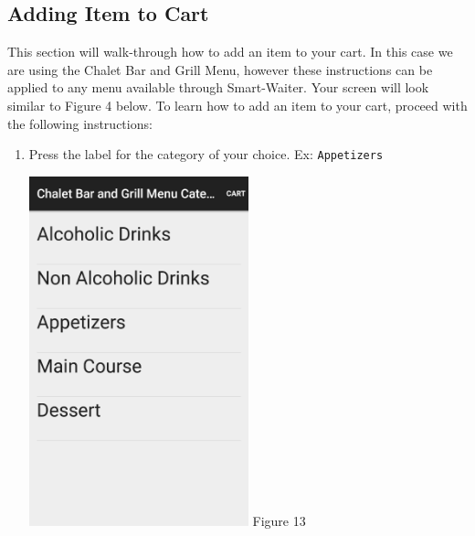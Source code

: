 \documentclass[12pt, titlepage]{article}
\begin{document}
\subsection{Adding Item to Cart}
This section will walk-through how to add an item to your cart. In this case we are using the Chalet Bar and Grill Menu, however these instructions can be applied to any menu available through Smart-Waiter. Your screen will look similar to Figure 4 below. To learn how to add an item to your cart, proceed with the following instructions:
	\begin{enumerate}
		\item Press the label for the category of your choice. Ex: 						\texttt{Appetizers}

	\begin{center}
		\includegraphics[width=0.5\textwidth]{main-menu.png}
		\linebreak Figure 13
	\end{center}


\end{enumerate}
\end{document}
